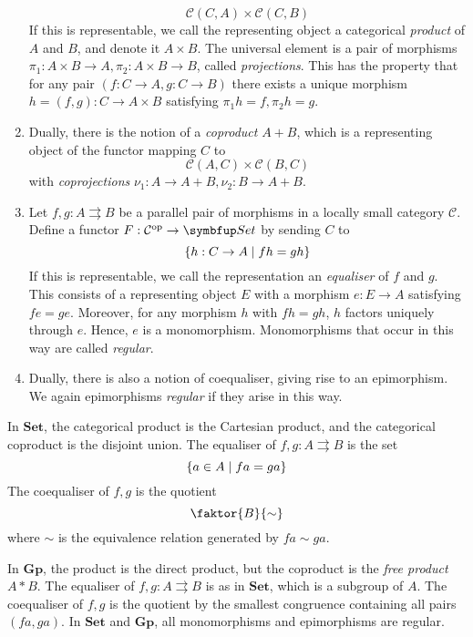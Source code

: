 \begin{enumerate}
    \[ \mathcal C(C, A) \times \mathcal C(C, B) \]
    If this is representable, we call the representing object a categorical \emph{product} of \( A \) and \( B \), and denote it \( A \times B \).
    The universal element is a pair of morphisms \( \pi_1 : A \times B \to A, \pi_2 : A \times B \to B \), called \emph{projections}.
    This has the property that for any pair \( (f : C \to A, g : C \to B) \) there exists a unique morphism \( h = (f, g) : C \to A \times B \) satisfying \( \pi_1 h = f, \pi_2 h = g \).
    \item Dually, there is the notion of a \emph{coproduct} \( A + B \), which is a representing object of the functor mapping \( C \) to
    \[ \mathcal C(A, C) \times \mathcal C(B, C) \]
    with \emph{coprojections} \( \nu_1 : A \to A + B, \nu_2 : B \to A + B \).
    \item Let \( f, g : A \rightrightarrows B \) be a parallel pair of morphisms in a locally small category \( \mathcal C \).
    Define a functor \( F : \mathcal C^\cop \to \mathbf{Set} \) by sending \( C \) to
    \[ \qty{h : C \to A \mid fh = gh} \]
    If this is representable, we call the representation an \emph{equaliser} of \( f \) and \( g \).
    This consists of a representing object \( E \) with a morphism \( e : E \to A \) satisfying \( fe = ge \).
    Moreover, for any morphism \( h \) with \( fh = gh \), \( h \) factors uniquely through \( e \).
    Hence, \( e \) is a monomorphism.
    Monomorphisms that occur in this way are called \emph{regular}.
    \item Dually, there is also a notion of coequaliser, giving rise to an epimorphism.
    We again epimorphisms \emph{regular} if they arise in this way.
\end{enumerate}
In \( \mathbf{Set} \), the categorical product is the Cartesian product, and the categorical coproduct is the disjoint union.
The equaliser of \( f, g : A \rightrightarrows B \) is the set
\[ \qty{a \in A \mid fa = ga} \]
The coequaliser of \( f, g \) is the quotient
\[ \faktor{B}{\sim} \]
where \( \sim \) is the equivalence relation generated by \( fa \sim ga \).

In \( \mathbf{Gp} \), the product is the direct product, but the coproduct is the \emph{free product} \( A \ast B \).
The equaliser of \( f, g : A \rightrightarrows B \) is as in \( \mathbf{Set} \), which is a subgroup of \( A \).
The coequaliser of \( f, g \) is the quotient by the smallest congruence containing all pairs \( (fa, ga) \).
In \( \mathbf{Set} \) and \( \mathbf{Gp} \), all monomorphisms and epimorphisms are regular.

